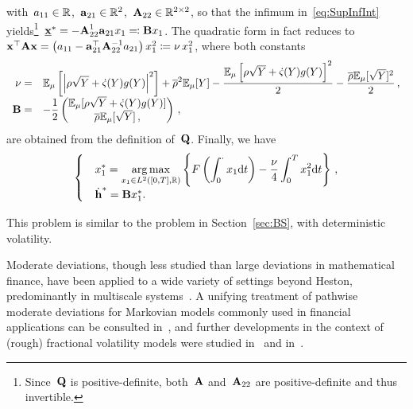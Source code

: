 with~$a_{11} \in\mathbb{R}$,~$\boldsymbol{\mathrm{a}}_{21}\in\mathbb{R}^{2}$,~$\boldsymbol{\mathrm{A}}_{22}\in\mathbb{R}^{2\times 2}$, so that the infimum in~\eqref{eq:SupInfInt} yields\footnote{Since~$\boldsymbol{\mathrm{Q}}$ is positive-definite, both~$\boldsymbol{\mathrm{A}}$ and~$\boldsymbol{\mathrm{A}}_{22}$ are positive-definite and thus invertible.}~${\underline{\boldsymbol{\mathrm{x}}}^{*} = - \boldsymbol{\mathrm{A}}_{22}^{1} \boldsymbol{\mathrm{a}}_{21} x_1 \eqqcolon \boldsymbol{\mathrm{B}} x_1}$. The quadratic form in fact reduces to~${\boldsymbol{\mathrm{x}}^\top \boldsymbol{\mathrm{A}} \boldsymbol{\mathrm{x}} = \left( a_{11} - \boldsymbol{\mathrm{a}}_{21}^\top \boldsymbol{\mathrm{A}}_{22}^{-1} a_{21} \right ) x_1^2 \coloneqq \nu\, x_1^2}$, where both constants
\begin{equation}\label{eq:ConstPDP}
\begin{array}{rl}
\nu = & \displaystyle 
\mathbb{E}_\mu\left[ \left| \rho\sqrt{Y} + \dot{\varsigma}(Y)g(Y)\right|^2 \right ] + \overline{\rho}^2\mathbb{E}_\mu[Y] - \frac{\mathbb{E}_\mu\left[ \rho\sqrt{Y} + \dot{\varsigma}(Y)g(Y)\right]^2}{2} - \frac{\overline{\rho}\mathbb{E}_\mu[\sqrt{Y}]^2}{2}\,, \\
\boldsymbol{\mathrm{B}} = & \displaystyle -\frac{1}{2}\begin{pmatrix}
\mathbb{E}_\mu[\rho\sqrt{Y}+\dot{\varsigma}(Y)g(Y)] \\
\overline{\rho}\mathbb{E}_\mu[\sqrt{Y}]\,,
\end{pmatrix}\,,
\end{array}
\end{equation}
are obtained from the definition of~$\boldsymbol{\mathrm{Q}}$. Finally, we have
\begin{equation}\label{pb-deterministic-large}
\begin{cases}
&\displaystyle x_1^{*}=\operatorname*{arg\,max}\limits_{x_1 \in L^2([0,T],\mathbb{R})}
\left\{F\left(\int_0^\cdot x_1\mathrm{d} t\right) - \frac{\nu}{4}\int_0^T x_1^2 \mathrm{d} t\right\}\,,
\\
&\dot{\boldsymbol{\mathrm{h}}}^{*}
= \boldsymbol{\mathrm{B}} x_1^{*}.
\end{cases}
\end{equation}
\begin{remark}
This problem is similar to the problem in Section~\ref{sec:BS}, with deterministic volatility.
\end{remark}

Moderate deviations, though less studied
than large deviations in mathematical finance,  
have been applied to a wide variety of settings beyond Heston, predominantly in multiscale systems~\cite{Morse2017ModerateDiffusions, Morse2020ImportanceDeviations}. 
A unifying treatment of pathwise moderate deviations for Markovian models commonly used in financial applications
can be consulted in~\cite{Jacquier2019PathwisePricing},
and further developments in the context of (rough) fractional volatility models 
were studied in~\cite{Bayer2018Short-timeModels} 
and in~\cite{Jacquier2022LargeSystems}.


